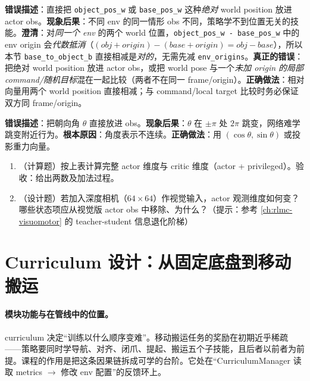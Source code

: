\begin{pitfall}
\textbf{错误描述}：直接把 \verb|object_pos_w| 或 \verb|base_pos_w| 这种\emph{绝对} world position 放进 actor obs。\textbf{现象后果}：不同 env 的同一情形 obs 不同，策略学不到位置无关的技能。\textbf{澄清}：对\emph{同一个 env} 的两个 world 位置，\verb|object_pos_w - base_pos_w| 中的 env origin 会\emph{代数抵消}（$(obj+origin)-(base+origin)=obj-base$），所以本节 \verb|base_to_object_b| 直接相减是\emph{对的}，无需先减 \verb|env_origins|。\textbf{真正的错误}：把绝对 world position 放进 actor obs，或把 world pose 与一个\emph{未加 origin 的局部 command/随机目标}混在一起比较（两者不在同一 frame/origin）。\textbf{正确做法}：相对向量用两个 world position 直接相减；与 command/local target 比较时务必保证双方同 frame/origin。
\end{pitfall}

\begin{pitfall}[用欧拉角表示底盘朝向]
\textbf{错误描述}：把朝向角 $\theta$ 直接放进 obs。\textbf{现象后果}：$\theta$ 在 $\pm\pi$ 处 $2\pi$ 跳变，网络难学跳变附近行为。\textbf{根本原因}：角度表示不连续。\textbf{正确做法}：用 $(\cos\theta,\sin\theta)$ 或投影重力向量。
\end{pitfall}

\begin{practice}[观测设计]
\begin{enumerate}
\item （计算题）按上表计算完整 actor 维度与 critic 维度（actor + privileged）。验收：给出两数及加法过程。
\item （设计题）若加入深度相机（$64\times64$）作视觉输入，actor 观测维度如何变？哪些状态项应从视觉版 actor obs 中移除、为什么？（提示：参考 \cref{ch:rlmc-visuomotor} 的 teacher-student 信息退化阶梯）
\end{enumerate}
\end{practice}

\section{Curriculum 设计：从固定底盘到移动搬运}
\label{sec:rlmc-wh-curriculum}

\paragraph{模块功能与在管线中的位置。}curriculum 决定“训练以什么顺序变难”。移动搬运任务的奖励在初期近乎稀疏——策略要同时学导航、对齐、闭爪、提起、搬运五个子技能，且后者以前者为前提。课程的作用是把这条因果链拆成可学的台阶。它处在“CurriculumManager 读取 metrics $\to$ 修改 env 配置”的反馈环上。

